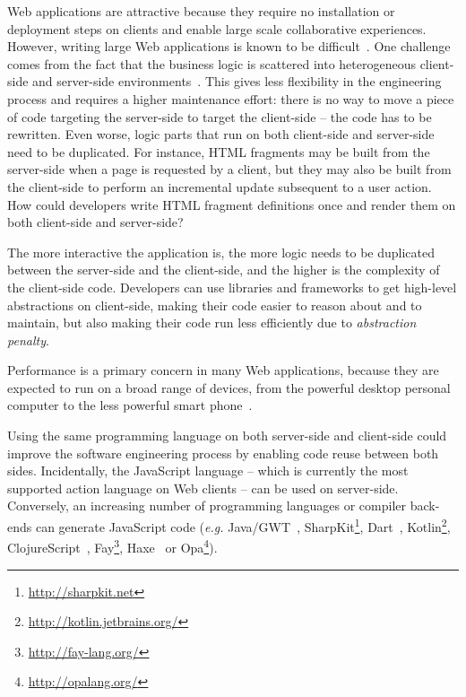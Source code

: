 \documentclass[preprint]{sigplanconf}
\newcommand{\eg}{\emph{e.g.}}
\begin{document}

Web applications are attractive because they require no installation or deployment steps on clients
and enable large scale collaborative experiences. However, writing large Web applications is known
to be difficult~\cite{Mikkonen08_SpaghettiJs,Preciado05_RIAMethodologyNecessity}. One challenge
comes from the fact that the business logic is scattered into heterogeneous client-side and
server-side environments~\cite{Echeverria09_RIA,Kuuskeri09_PartitioningClientServer}. This gives
less flexibility in the engineering process and requires a higher maintenance effort: there is no
way to move a piece of code targeting the server-side to target the client-side -- the code has to
be rewritten. Even worse, logic parts that run on both client-side and server-side need to be
duplicated. For instance, HTML fragments may be built from the server-side when a page is requested
by a client, but they may also be built from the client-side to perform an incremental update
subsequent to a user action. How could developers write HTML fragment definitions once and render
them on both client-side and server-side?

The more interactive the application is, the more logic needs to be duplicated between the
server-side and the client-side, and the higher is the complexity of the client-side code.
Developers can use libraries and frameworks to get high-level abstractions on client-side, making
their code easier to reason about and to maintain, but also making their code run less efficiently
due to \emph{abstraction penalty}.

Performance is a primary concern in many Web applications, because they are expected to run on a
broad range of devices, from the powerful desktop personal computer to the less powerful smart
phone~\cite{Souders08_Perf,Huang10_Perf}.

Using the same programming language on both server-side and client-side could improve the software
engineering process by enabling code reuse between both sides. Incidentally, the JavaScript language
-- which is currently the most supported action language on Web clients -- can be used on
server-side. Conversely, an increasing number of programming languages or compiler back-ends can
generate JavaScript code (\eg{} Java/GWT~\cite{Chaganti07_GWT},
SharpKit\footnote{\href{http://sharpkit.net}{http://sharpkit.net}}, Dart~\cite{Griffith11_Dart},
Kotlin\footnote{\href{http://kotlin.jetbrains.org/}{http://kotlin.jetbrains.org/}},
ClojureScript~\cite{McGranaghan11_ClojureScript},
Fay\footnote{\href{http://fay-lang.org/}{http://fay-lang.org/}},
Haxe~\cite{Cannasse08_HaXe} or Opa\footnote{\href{http://opalang.org/}{http://opalang.org/}}).
\end{document}

